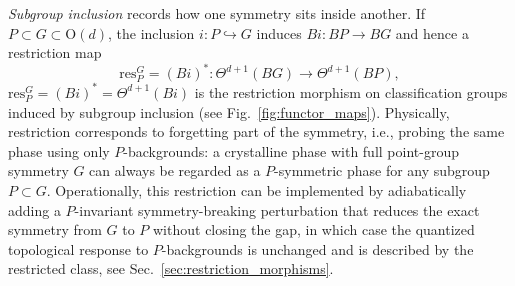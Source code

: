 \documentclass[aps,prx,reprint,superscriptaddress,twocolumn,amsmath,amssymb,amsfonts, nofootinbib]{revtex4-2}
\newcommand{\res}{\text{res}}
\theoremstyle{apsstyle}
\begin{document}
\textit{Subgroup inclusion} records how one symmetry sits inside another.
If $P\subset G\subset \mathrm{O}(d)$, the inclusion $i:P\hookrightarrow G$ induces $Bi: BP \to BG$ and hence a restriction map
\begin{equation*}
    \res^{G}_{P}=(Bi)^{*}: \Theta^{d+1}(BG)\longrightarrow \Theta^{d+1}(BP),
\end{equation*}
\noindent $\res^{G}_{P} = (Bi)^{*} = \Theta^{d+1}(Bi)$ is the restriction morphism on classification groups induced by subgroup inclusion (see Fig.~\ref{fig:functor_maps}). Physically, restriction corresponds to forgetting part of the symmetry, i.e., probing the same phase using only $P$-backgrounds: a crystalline phase with full point-group symmetry $G$ can always be regarded as a $P$-symmetric phase for any subgroup $P\subset G$. Operationally, this restriction can be implemented by adiabatically adding a $P$-invariant symmetry-breaking perturbation that reduces the exact symmetry from $G$ to $P$ without closing the gap, in which case the quantized topological response to $P$-backgrounds is unchanged and is described by the restricted class, see Sec.~\ref{sec:restriction_morphisms}.
\end{document}
